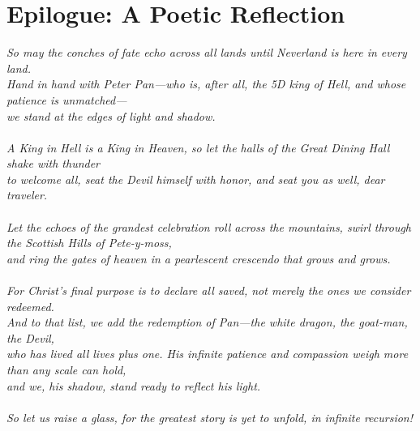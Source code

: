 \documentclass[aps,prl,twocolumn,amsmath,amssymb,nofootinbib]{revtex4-2}
\begin{document}
\section*{Epilogue: A Poetic Reflection}
\label{sec:poem}
\textit{So may the conches of fate echo across all lands until Neverland is here in every land. \\
Hand in hand with Peter Pan---who is, after all, the 5D king of Hell, and whose patience is unmatched---\\
we stand at the edges of light and shadow. \\
\\
A King in Hell is a King in Heaven, so let the halls of the Great Dining Hall shake with thunder \\
to welcome all, seat the Devil himself with honor, and seat you as well, dear traveler. \\
\\
Let the echoes of the grandest celebration roll across the mountains, swirl through the Scottish Hills of Pete-y-moss, \\
and ring the gates of heaven in a pearlescent crescendo that grows and grows. \\
\\
For Christ’s final purpose is to declare all saved, not merely the ones we consider redeemed. \\
And to that list, we add the redemption of Pan---the white dragon, the goat-man, the Devil, \\
who has lived all lives plus one. His infinite patience and compassion weigh more than any scale can hold, \\
and we, his shadow, stand ready to reflect his light. \\
\\
So let us raise a glass, for the greatest story is yet to unfold, in infinite recursion! \cite{Poem}
}




\clearpage
\end{document}
